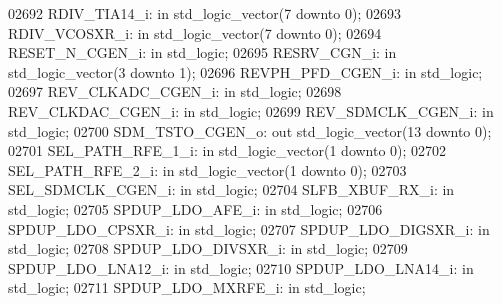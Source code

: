 \begin{DoxyCode}
02692     RDIV\_TIA14\_i:   \textcolor{keywordflow}{in} \textcolor{comment}{std\_logic\_vector}(\textcolor{vhdllogic}{}\textcolor{vhdllogic}{7} \textcolor{keywordflow}{downto} \textcolor{vhdllogic}{}\textcolor{vhdllogic}{0});
02693     RDIV\_VCOSXR\_i:  \textcolor{keywordflow}{in} \textcolor{comment}{std\_logic\_vector}(\textcolor{vhdllogic}{}\textcolor{vhdllogic}{7} \textcolor{keywordflow}{downto} \textcolor{vhdllogic}{}\textcolor{vhdllogic}{0});
02694     RESET\_N\_CGEN\_i: \textcolor{keywordflow}{in} \textcolor{comment}{std\_logic};
02695     RESRV\_CGN\_i:    \textcolor{keywordflow}{in} \textcolor{comment}{std\_logic\_vector}(\textcolor{vhdllogic}{}\textcolor{vhdllogic}{3} \textcolor{keywordflow}{downto} \textcolor{vhdllogic}{}\textcolor{vhdllogic}{1});
02696     REVPH\_PFD\_CGEN\_i:   \textcolor{keywordflow}{in} \textcolor{comment}{std\_logic};
02697     REV\_CLKADC\_CGEN\_i:  \textcolor{keywordflow}{in} \textcolor{comment}{std\_logic};
02698     REV\_CLKDAC\_CGEN\_i:  \textcolor{keywordflow}{in} \textcolor{comment}{std\_logic};
02699     REV\_SDMCLK\_CGEN\_i:  \textcolor{keywordflow}{in} \textcolor{comment}{std\_logic};
02700     SDM\_TSTO\_CGEN\_o:    \textcolor{keywordflow}{out} \textcolor{comment}{std\_logic\_vector}(\textcolor{vhdllogic}{}\textcolor{vhdllogic}{13} \textcolor{keywordflow}{downto} \textcolor{vhdllogic}{}\textcolor{vhdllogic}{0});  
02701     SEL\_PATH\_RFE\_1\_i:   \textcolor{keywordflow}{in} \textcolor{comment}{std\_logic\_vector}(\textcolor{vhdllogic}{}\textcolor{vhdllogic}{1} \textcolor{keywordflow}{downto} \textcolor{vhdllogic}{}\textcolor{vhdllogic}{0});
02702     SEL\_PATH\_RFE\_2\_i:   \textcolor{keywordflow}{in} \textcolor{comment}{std\_logic\_vector}(\textcolor{vhdllogic}{}\textcolor{vhdllogic}{1} \textcolor{keywordflow}{downto} \textcolor{vhdllogic}{}\textcolor{vhdllogic}{0});
02703     SEL\_SDMCLK\_CGEN\_i:  \textcolor{keywordflow}{in} \textcolor{comment}{std\_logic};
02704     SLFB\_XBUF\_RX\_i: \textcolor{keywordflow}{in} \textcolor{comment}{std\_logic};
02705     SPDUP\_LDO\_AFE\_i:    \textcolor{keywordflow}{in} \textcolor{comment}{std\_logic};
02706     SPDUP\_LDO\_CPSXR\_i:  \textcolor{keywordflow}{in} \textcolor{comment}{std\_logic};
02707     SPDUP\_LDO\_DIGSXR\_i: \textcolor{keywordflow}{in} \textcolor{comment}{std\_logic};
02708     SPDUP\_LDO\_DIVSXR\_i: \textcolor{keywordflow}{in} \textcolor{comment}{std\_logic};
02709     SPDUP\_LDO\_LNA12\_i:  \textcolor{keywordflow}{in} \textcolor{comment}{std\_logic};
02710     SPDUP\_LDO\_LNA14\_i:  \textcolor{keywordflow}{in} \textcolor{comment}{std\_logic};
02711     SPDUP\_LDO\_MXRFE\_i:  \textcolor{keywordflow}{in} \textcolor{comment}{std\_logic};

\end{DoxyCode}
